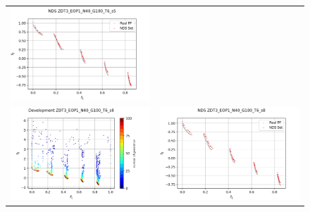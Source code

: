 \begin{figure}[H]
\begin{tabular}{c c}
    \includegraphics[scale=0.5]{figures/ZDT3_EOP1_N40_G100_T6/s5_nds.png}\\
    \includegraphics[scale=0.5]{figures/ZDT3_EOP1_N40_G100_T6/s8_dev.png} &
    \includegraphics[scale=0.5]{figures/ZDT3_EOP1_N40_G100_T6/s8_nds.png}\\

\end{tabular}
\end{figure}
